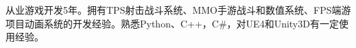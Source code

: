 


\cvself
{从业游戏开发5年。拥有TPS射击战斗系统、MMO手游战斗和数值系统、FPS端游项目动画系统的开发经验。熟悉Python、C++，C\#，对UE4和Unity3D有一定使用经验。}
